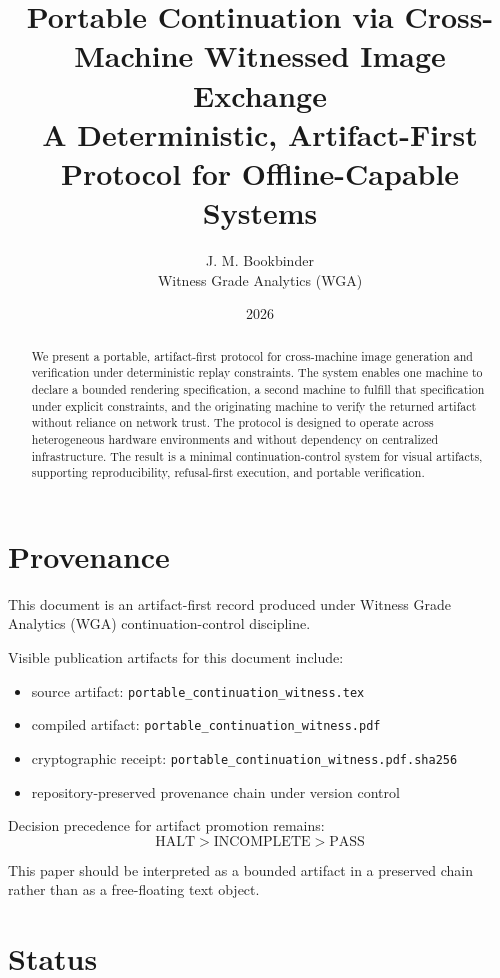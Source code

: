 \documentclass[11pt]{article}
\title{Portable Continuation via Cross-Machine Witnessed Image Exchange\\
\large A Deterministic, Artifact-First Protocol for Offline-Capable Systems}
\author{J. M. Bookbinder \\ Witness Grade Analytics (WGA)}
\date{2026}
\begin{document}
\maketitle

\begin{abstract}
We present a portable, artifact-first protocol for cross-machine image generation and verification under deterministic replay constraints. The system enables one machine to declare a bounded rendering specification, a second machine to fulfill that specification under explicit constraints, and the originating machine to verify the returned artifact without reliance on network trust. The protocol is designed to operate across heterogeneous hardware environments and without dependency on centralized infrastructure. The result is a minimal continuation-control system for visual artifacts, supporting reproducibility, refusal-first execution, and portable verification.
\end{abstract}

\section*{Provenance}

This document is an artifact-first record produced under Witness Grade Analytics (WGA) continuation-control discipline.

Visible publication artifacts for this document include:
\begin{itemize}
\item source artifact: \texttt{portable\_continuation\_witness.tex}
\item compiled artifact: \texttt{portable\_continuation\_witness.pdf}
\item cryptographic receipt: \texttt{portable\_continuation\_witness.pdf.sha256}
\item repository-preserved provenance chain under version control
\end{itemize}

Decision precedence for artifact promotion remains:
\[
\text{HALT} > \text{INCOMPLETE} > \text{PASS}
\]

This paper should be interpreted as a bounded artifact in a preserved chain rather than as a free-floating text object.

\section*{Status}
\end{document}

